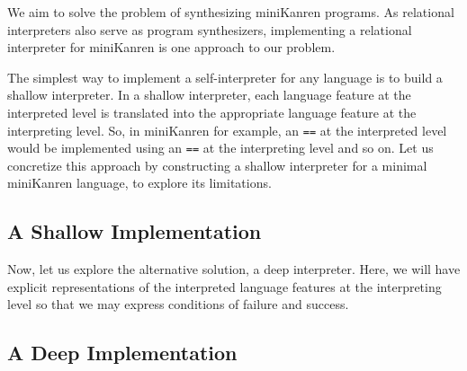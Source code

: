 We aim to solve the problem of synthesizing miniKanren programs. As relational
interpreters also serve as program synthesizers, implementing a relational
interpreter for miniKanren is one approach to our problem.

The simplest way to implement a self-interpreter for any language is to build a
shallow interpreter. In a shallow interpreter, each language feature at the
interpreted level is translated into the appropriate language feature at the
interpreting level. So, in miniKanren for example, an \Verb|==| at the
interpreted level would be implemented using an \Verb|==| at the interpreting
level and so on. Let us concretize this approach by constructing a shallow
interpreter for a minimal miniKanren language, to explore its limitations.

\subsection{A Shallow Implementation}
\label{subsec:shallow}


Now, let us explore the alternative solution, a deep interpreter. Here, we will
have explicit representations of the interpreted language features at the
interpreting level so that we may express conditions of failure and success.

\subsection{A Deep Implementation}
\label{subsec:deep}

